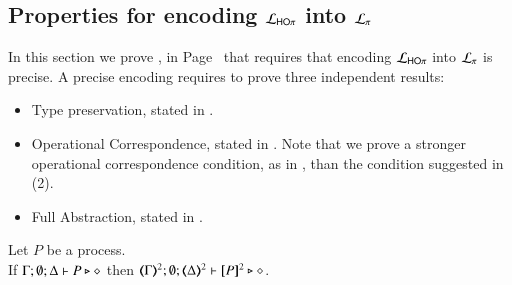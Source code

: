 \subsection{Properties for encoding $\mathcal{L}_{\mathsf{HO}\pi}$ into $\mathcal{L}_{\pi}$}
\label{app:enc:HOp_to_sessp}

In this section we prove , in Page~\pageref{f:enc:hotopi}
that requires that encoding
$\mathcal{L}_{\mathsf{HO}\pi}$ into $\mathcal{L}_{\pi}$ is precise.
A precise encoding requires to prove three independent results:
\begin{itemize}
	\item	Type preservation, stated in .
	\item	Operational Correspondence, stated in .
		Note that we prove a stronger operational correspondence condition,
		as in ,
		than the condition suggested in (2).
	\item	Full Abstraction, stated in .
\end{itemize}


\begin{proposition}\rm
	\label{app:prop:typepres_HOp_to_p}
	Let $P$ be a \HOp process. \\
	If $\Gamma; \emptyset; \Delta \vdash P \triangleright \diamond$ then 
	$\mapt{\Gamma}^{2}; \emptyset; \mapt{\Delta}^{2} \proves \map{P}^{2} \hastype \Proc$.
\end{proposition}



